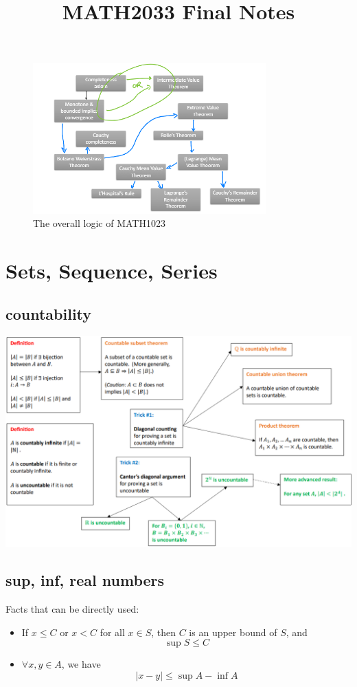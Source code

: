 \documentclass[a4paper,10pt]{article}
\title{MATH2033 Final Notes}
\begin{document}
\maketitle
\vspace{5cm}
\begin{figure}[ht]
    \centering
    \includegraphics[width=0.8\textwidth]{1023summary.png}
    \caption{The overall logic of MATH1023}
    \label{fig:math2033}
\end{figure}
\newpage


\section{Sets, Sequence, Series}
\subsection{countability}
\begin{center}
    \includegraphics[width=\textwidth]{countability.png} 
\end{center}

\subsection{sup, inf, real numbers}
\noindent Facts that can be directly used:
\begin{itemize}
    \item If $x\leq C \text{ or } x<C$ for all $x\in S$, then $C$ is an upper bound of $S$, and\[
        \sup S \leq C
    \]
    \item $\forall x,y\in A$, we have\[
        |x-y| \leq \sup A - \inf A
    \]
\end{itemize}
\end{document}
